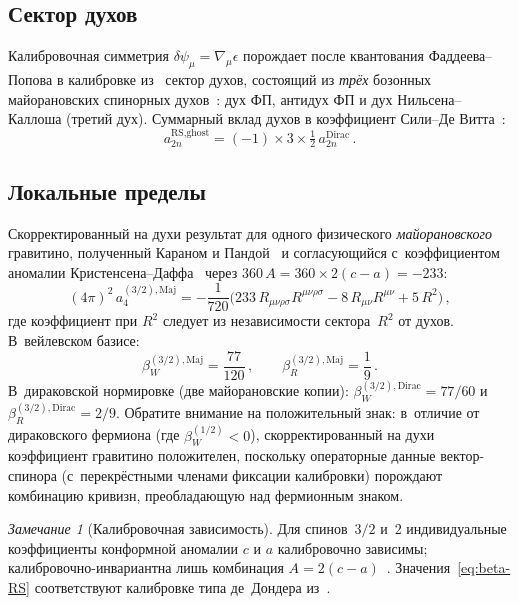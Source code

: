 \documentclass[aps,prd,twocolumn,superscriptaddress,nofootinbib,floatfix]{revtex4-2}
\theoremstyle{definition}
\theoremstyle{remark}
\newtheorem{remark}[theorem]{\cyrillicfont Замечание}
\newcommand{\Ricsq}{R_{\mu\nu}R^{\mu\nu}}
\newcommand{\Riemsq}{R_{\mu\nu\rho\sigma}R^{\mu\nu\rho\sigma}}
\begin{document}
\subsection{Сектор духов}

Калибровочная симметрия $\delta\psi_\mu = \nabla_\mu\epsilon$ порождает
после квантования Фаддеева--Попова в калибровке из~\cite{Karan:2017txu}
сектор духов, состоящий из \emph{трёх} бозонных майорановских спинорных
духов~\cite{KaranPanda:2021,Lekeu:2021ieh}: дух ФП, антидух ФП и
дух Нильсена--Каллоша (третий дух). Суммарный вклад духов в коэффициент
Сили--Де Витта~\cite{KaranPanda:2021}:
\begin{equation}
  a_{2n}^{\text{RS,ghost}} = (-1) \times 3 \times \tfrac{1}{2}\,
    a_{2n}^{\text{Dirac}}\,.
  \label{eq:RS-ghost}
\end{equation}

\subsection{Локальные пределы}

Скорректированный на духи результат для одного физического
\emph{майорановского} гравитино, полученный Караном и
Пандой~\cite{KaranPanda:2021} и согласующийся с~коэффициентом аномалии
Кристенсена--Даффа~\cite{ChristensenDuff:1979,ChristensenDuff:1980}
через $360\,A = 360\times 2(c - a) = -233$:
\begin{equation}
  (4\pi)^2\,a_4^{(3/2),\text{Maj}}
  = -\frac{1}{720}\bigl(233\,\Riemsq - 8\,\Ricsq + 5\,R^2\bigr)\,,
  \label{eq:a4-RS-full}
\end{equation}
где коэффициент при $R^2$ следует из независимости сектора~$R^2$ от
духов. В~вейлевском базисе:
\begin{equation}
  \boxed{
    \beta_W^{(3/2),\text{Maj}} = \frac{77}{120}\,,\qquad
    \beta_R^{(3/2),\text{Maj}} = \frac{1}{9}\,.
  }
  \label{eq:beta-RS}
\end{equation}
В~дираковской нормировке (две майорановские копии):
$\beta_W^{(3/2),\text{Dirac}} = 77/60$ и
$\beta_R^{(3/2),\text{Dirac}} = 2/9$.
Обратите внимание на положительный знак: в~отличие от дираковского фермиона
(где $\beta_W^{(1/2)} < 0$), скорректированный на духи коэффициент
гравитино положителен, поскольку операторные данные вектор-спинора
(с~перекрёстными членами фиксации калибровки) порождают комбинацию
кривизн, преобладающую над фермионным знаком.

\begin{remark}[Калибровочная зависимость]
\label{rem:gauge-dep}
Для спинов~$3/2$ и~$2$ индивидуальные коэффициенты конформной аномалии $c$
и $a$ калибровочно зависимы; калибровочно-инвариантна лишь комбинация
$A = 2(c - a)$~\cite{ChristensenDuff:1979,vanNieuwenhuizen:1981ae}.
Значения~\eqref{eq:beta-RS} соответствуют калибровке типа де~Дондера
из~\cite{Karan:2017txu}.
\end{remark}
\end{document}
